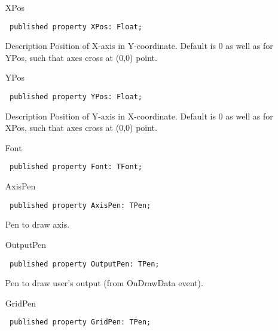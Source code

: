 \documentclass[12pt,a4paper,oneside]{report}
\newcommand{\declarationitem}[1]{{\addfontfeatures{FakeBold=1.3} #1}}
\newcommand{\descriptiontitle}[1]{{\addfontfeatures{FakeSlant}#1}}
\newcommand{\code}[1]{\texttt{#1}}
\begin{document}
\begin{itemize}
\item[\declarationitem{XPos}\hfill]
\begin{flushleft}
\code{
published property XPos: Float;}
\end{flushleft}
\label{lmcoordsys.TCoordSys-YPos}
\item[\descriptiontitle{Description}] Position of X-axis in Y-coordinate. Default is 0 as well as for YPos, such that axes cross at (0,0) point.
\item[\declarationitem{YPos}\hfill]
\begin{flushleft}
\code{
published property YPos: Float;}
\end{flushleft}
\item[\descriptiontitle{Description}] Position of Y-axis in X-coordinate. Default is 0 as well as for XPos, such that axes cross at (0,0) point.
\label{lmcoordsys.TCoordSys-Font}
\item[\declarationitem{Font}\hfill]
\begin{flushleft}
\code{
published property Font: TFont;}

\end{flushleft}


\par  \label{lmcoordsys.TCoordSys-AxisPen}
\item[\declarationitem{AxisPen}\hfill]
\begin{flushleft}
\code{
published property AxisPen: TPen;}
\end{flushleft}

\par Pen to draw axis.\label{lmcoordsys.TCoordSys-OutputPen}
\item[\declarationitem{OutputPen}\hfill]
\begin{flushleft}
\code{
published property OutputPen: TPen;}
\end{flushleft}

\par Pen to draw user's output (from OnDrawData event).\label{lmcoordsys.TCoordSys-GridPen}
\item[\declarationitem{GridPen}\hfill]
\begin{flushleft}
\code{
published property GridPen: TPen;}
\end{flushleft}


\end{itemize}
\end{document}
